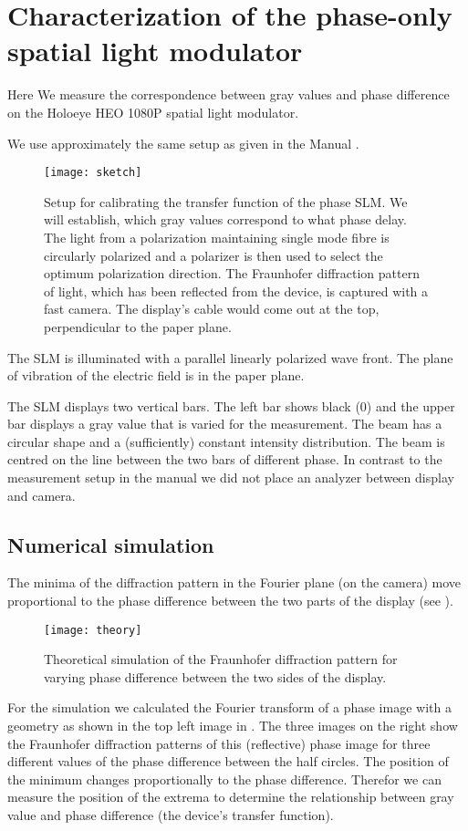\section{ Characterization of the phase-only spatial light modulator}
\begin{summary}
  Here We measure the correspondence between gray values and phase
  difference on the Holoeye HEO 1080P spatial light modulator. 
\end{summary}
We use approximately the same setup as given in the Manual
\citep{Holoeye2006}.
\begin{figure}[!hbt]
  \centering
  \texttt{[image: sketch]}
  \caption{Setup for calibrating the transfer function of the phase
    SLM. We will establish, which gray values correspond to what phase
    delay. The light from a polarization maintaining single mode fibre
    is circularly polarized and a polarizer is then used to select the
    optimum polarization direction. The Fraunhofer diffraction pattern
    of light, which has been reflected from the device, is captured
    with a fast camera. The display's cable would come out at the top,
    perpendicular to the paper plane.}
  \label{fig:holo-calib}
\end{figure}
The SLM is illuminated with a parallel linearly polarized wave
front. The plane of vibration of the electric field is in the paper
plane.

The SLM displays two vertical bars. The left bar shows black (0) and
the upper bar displays a gray value that is varied for the
measurement.  The beam has a circular shape and a (sufficiently)
constant intensity distribution. The beam is centred on the line
between the two bars of different phase.  In contrast to the
measurement setup in the manual we did not place an analyzer between
display and camera.
\subsection{Numerical simulation}
The minima of the diffraction pattern in the Fourier plane (on the
camera) move proportional to the phase difference between the two
parts of the display (see ).
\begin{figure}[!hbt]
  \centering
  \texttt{[image: theory]}
  \caption{Theoretical simulation of the Fraunhofer diffraction
    pattern for varying phase difference between the two sides of the
    display.}
  \label{fig:holo-theory}
\end{figure}
For the simulation we calculated the Fourier transform of a phase
image with a geometry as shown in the top left image in
.  The three images on the right show the
Fraunhofer diffraction patterns of this (reflective) phase image for
three different values of the phase difference between the half
circles. The position of the minimum changes proportionally to the
phase difference. Therefor we can measure the position of the extrema
to determine the relationship between gray value and phase difference
(the device's transfer function).

